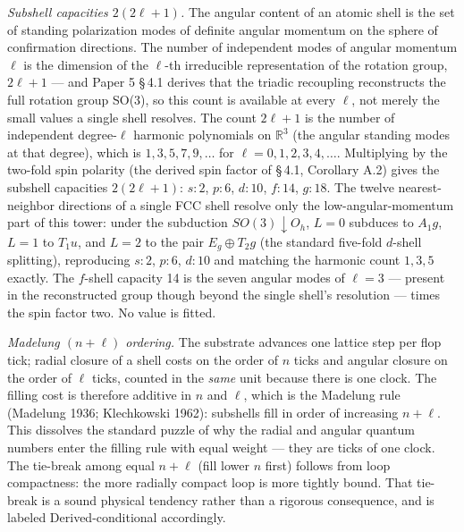 \documentclass[11pt,oneside]{report}
\theoremstyle{definition}
\theoremstyle{remark}
\begin{document}
\emph{Subshell capacities \ensuremath{2(2\ell+1)}.} The angular content of an atomic
shell is the set of standing polarization modes of definite angular momentum on
the sphere of confirmation directions. The number of independent modes of
angular momentum \ensuremath{\ell} is the dimension of the \ensuremath{\ell}-th irreducible
representation of the rotation group, \ensuremath{2\ell + 1} --- and Paper 5 \S\,4.1
derives that the triadic recoupling reconstructs the full rotation group SO(3),
so this count is available at every \ensuremath{\ell}, not merely the small values a single
shell resolves. The count \ensuremath{2\ell + 1} is the number of independent degree-\ensuremath{\ell}
harmonic polynomials on \ensuremath{\mathbb{R}^3} (the angular standing modes at that degree),
which is \ensuremath{1, 3, 5, 7, 9, \dots} for \ensuremath{\ell = 0, 1, 2, 3, 4, \dots}. Multiplying by
the two-fold spin polarity (the derived spin factor of \S\,4.1, Corollary A.2)
gives the subshell capacities \ensuremath{2(2\ell+1)}: \ensuremath{s: 2}, \ensuremath{p: 6}, \ensuremath{d: 10}, \ensuremath{f: 14},
\ensuremath{g: 18}. The twelve nearest-neighbor directions of a single FCC shell resolve
only the low-angular-momentum part of this tower: under the subduction
\ensuremath{SO(3) \downarrow O_{h}}, \ensuremath{L = 0} subduces to \ensuremath{A_{1}g}, \ensuremath{L = 1} to \ensuremath{T_{1}u}, and
\ensuremath{L = 2} to the pair \ensuremath{E_{g} \oplus T_{2}g} (the standard five-fold \ensuremath{d}-shell
splitting), reproducing \ensuremath{s: 2}, \ensuremath{p: 6}, \ensuremath{d: 10} and matching the harmonic count
\ensuremath{1, 3, 5} exactly. The \ensuremath{f}-shell capacity 14 is the seven angular modes of
\ensuremath{\ell = 3} --- present in the reconstructed group though beyond the single
shell's resolution --- times the spin factor two. No value is fitted.

\emph{Madelung \ensuremath{(n+\ell)} ordering.} The substrate advances one lattice step
per flop tick; radial closure of a shell costs on the order of \ensuremath{n} ticks
and angular closure on the order of \ensuremath{\ell} ticks, counted in the \emph{same}
unit because there is one clock. The filling cost is therefore additive in
\ensuremath{n} and \ensuremath{\ell}, which is the Madelung rule (Madelung 1936; Klechkowski 1962):
subshells fill in order of
increasing \ensuremath{n + \ell}. This dissolves the standard puzzle of why the radial
and angular quantum numbers enter the filling rule with equal weight ---
they are ticks of one clock. The tie-break among equal \ensuremath{n + \ell} (fill
lower \ensuremath{n} first) follows from loop compactness: the more radially compact
loop is more tightly bound. That tie-break is a sound physical tendency
rather than a rigorous consequence, and is labeled Derived-conditional
accordingly.
\end{document}
